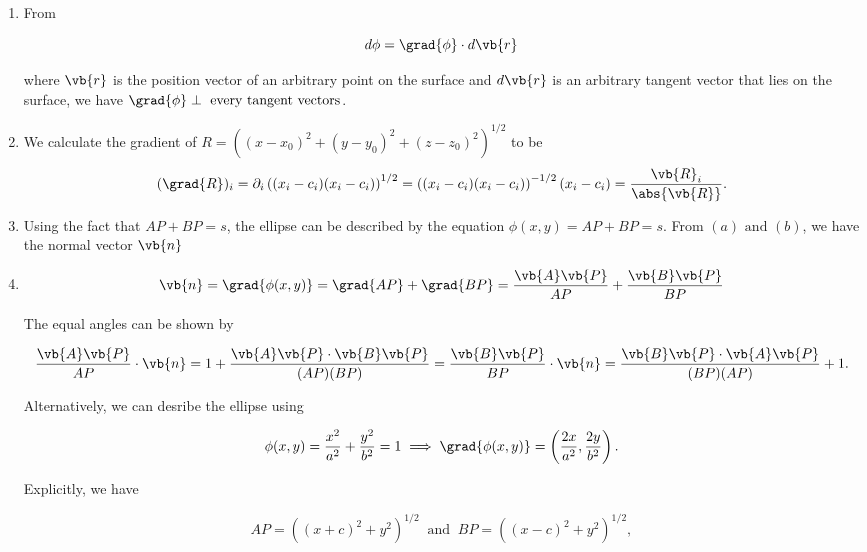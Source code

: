 \documentclass[english,a4paper,12pt]{report}
\begin{document}
{\begin{enumerate}
	\item From 
	
	\begin{equation}
		d \phi = \grad{\phi } \cdot d\vb{r}
	\end{equation}
	
	where \(\vb{r} \) is the position vector of an arbitrary point on the surface and \(d\vb{r} \) is an arbitrary tangent vector that lies on the surface, we have \(\grad{\phi } \perp \text{ every tangent vectors} \). 
	\item We calculate the gradient of \(R= ((x-x_0 )^2+(y-y_0 )^2+(z-z_0 )^2)^{1 /2} \) to be
	\begin{equation}
		(\grad{R} )_{i} = \partial _{i} \left( (x_{i} - c_{i}  ) (x_{i } - c_{i}  )\right)^{1 /2} = \left( (x_{i}-c_{i}  )(x_{i} - c_{i}  ) \right)^{-1/2} (x_{i} - c_{i}  ) = \frac{\vb{R}_{i} }{\abs{\vb{R} } }.      
	\end{equation}
	\item Using the fact that \(AP + BP = s\), the ellipse can be described by the equation \(\phi (x,y) = AP + BP = s\). From \((a) \text { and } (b)\), we have the normal vector \(\vb{n} \)
	\item  
	\begin{equation}
		\vb{n} = \grad{\phi (x,y)} = \grad{AP} + \grad{BP} = \frac{\vb{A} \vb{P} }{AP} + \frac{\vb{B} \vb{P} }{BP}     
	\end{equation}

	The equal angles can be shown by 

	\begin{equation}
		\frac{\vb{A} \vb{P} }{AP} \cdot \vb{n} = 1 + \frac{\vb{A} \vb{P} \cdot \vb{B} \vb{P} }{(AP)(BP)} = \frac{\vb{B} \vb{P} }{BP} \cdot \vb{n} = \frac{\vb{B} \vb{P} \cdot \vb{A} \vb{P} }{(BP)(AP)} + 1.    
	\end{equation}
	
	Alternatively, we can desribe the ellipse using 

	\begin{equation}
		\phi (x,y) = \frac{x^2}{a^2} + \frac{y^2}{b^2} = 1 \implies \grad{\phi (x,y)} = \left( \frac{2x}{a^2},\frac{2y}{b^2}   \right).
	\end{equation}

	Explicitly, we have

	\begin{equation}
		AP = \left( (x+c)^2+y^2 \right)^{1 /2} ~\text { and }~ BP = \left( (x-c)^2+y^2 \right) ^{1 /2}, 
	\end{equation}


\end{enumerate}}
\end{document}
